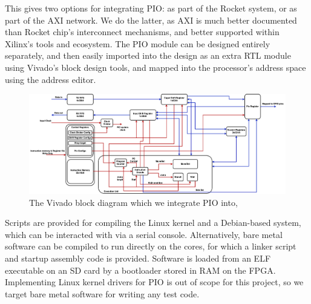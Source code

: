 This gives two options for integrating PIO: as part of the Rocket system, or as part of the AXI network. We do the latter, as AXI is much better documented than Rocket chip's interconnect mechanisms, and better supported within Xilinx's tools and ecosystem. The PIO module can be designed entirely separately, and then easily imported into the design as an extra RTL module using Vivado's block design tools, and mapped into the processor's address space using the address editor.

\begin{figure}[H]
    \centering
    \includegraphics[width=1.1\textwidth]{../img/bd.png}
    \caption{The Vivado block diagram which we integrate PIO into,}
    \label{fig:vivado-bd}
\end{figure}

Scripts are provided for compiling the Linux kernel and a Debian-based system, which can be interacted with via a serial console. Alternatively, bare metal software can be compiled to run directly on the cores, for which a linker script and startup assembly code is provided. Software is loaded from an ELF executable on an SD card by a bootloader stored in RAM on the FPGA. Implementing Linux kernel drivers for PIO is out of scope for this project, so we target bare metal software for writing any test code.



